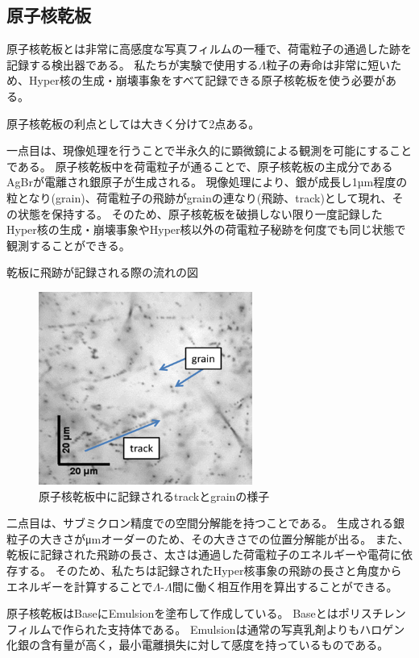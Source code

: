 \documentclass[12pt,a4paper]{jarticle}
\begin{document}
\subsection{原子核乾板}
原子核乾板とは非常に高感度な写真フィルムの一種で、荷電粒子の通過した跡を記録する検出器である。
私たちが実験で使用する$\Lambda$粒子の寿命は非常に短いため、Hyper核の生成・崩壊事象をすべて記録できる原子核乾板を使う必要がある。
\par
原子核乾板の利点としては大きく分けて2点ある。
\par
一点目は、現像処理を行うことで半永久的に顕微鏡による観測を可能にすることである。
原子核乾板中を荷電粒子が通ることで、原子核乾板の主成分であるAgBrが電離され銀原子が生成される。
現像処理により、銀が成長し1µm程度の粒となり(grain)、荷電粒子の飛跡がgrainの連なり(飛跡、track)として現れ、その状態を保持する。
そのため、原子核乾板を破損しない限り一度記録したHyper核の生成・崩壊事象やHyper核以外の荷電粒子秘跡を何度でも同じ状態で観測することができる。
\par
乾板に飛跡が記録される際の流れの図
\par
\begin{figure}[htbp]
 \begin{center}
  \includegraphics[width=70mm]{grainfog.png}
 \end{center}
 \caption{原子核乾板中に記録されるtrackとgrainの様子\label{fig:grain_track}}
\end{figure}
二点目は、サブミクロン精度での空間分解能を持つことである。
生成される銀粒子の大きさがμmオーダーのため、その大きさでの位置分解能が出る。
また、乾板に記録された飛跡の長さ、太さは通過した荷電粒子のエネルギーや電荷に依存する。
そのため、私たちは記録されたHyper核事象の飛跡の長さと角度からエネルギーを計算することで$\Lambda$-$\Lambda$間に働く相互作用を算出することができる。
\par
原子核乾板はBaseにEmulsionを塗布して作成している。
Baseとはポリスチレンフィルムで作られた支持体である。
Emulsionは通常の写真乳剤よりもハロゲン化銀の含有量が高く，最小電離損失に対して感度を持っているものである。
\end{document}
